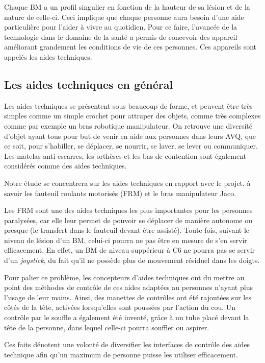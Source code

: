 \documentclass[letterpaper, twoside, 12pt, memoire, creativecommons, hyperref]{thETS}
\begin{document}
Chaque BM a un profil singulier en fonction de la hauteur de sa lésion et de la nature de celle-ci. Ceci implique que chaque personne aura besoin d'une aide particulière pour l'aider à vivre au quotidien. Pour ce faire,  l'avancée de la technologie dans le domaine de la santé a permis de concevoir des appareil améliorant grandement les conditions de vie de ces personnes. Ces appareils sont appelés les aides techniques. 

\subsection{Les aides techniques en général}

Les aides techniques se présentent sous beaucoup de forme, et peuvent être très simples comme un simple crochet pour attraper des objets, comme très complexes comme par exemple un bras robotique manipulateur. On retrouve une diversité d'objet ayant tous pour but de venir en aide aux personnes dans leurs AVQ, que ce soit, pour s'habiller, se déplacer, se nourrir, se laver, se lever ou communiquer. Les matelas anti-escarres, les orthèses et les bas de contention sont également considérés comme des aides techniques.

Notre étude se concentrera sur les aides techniques en rapport avec le projet, à savoir les fauteuil roulants motorisés (FRM) et le bras manipulateur Jaco.

Les FRM sont une des aides techniques les plus importantes pour les personnes paralysées, car elle leur permet de pouvoir se déplacer de manière autonome ou presque (le transfert dans le fauteuil devant être assisté). Toute fois, suivant le niveau de lésion d'un BM, celui-ci pourra ne pas être en mesure de s'en servir efficacement. En effet, un BM de niveau suppérieur à C6 ne pourra pas se servir d'un \textit{joystick}, du fait qu'il ne possède plus de mouvement résiduel dans les doigts. 

Pour palier ce problème, les concepteurs d'aides techniques ont du mettre au point des méthodes de contrôle de ces aides adaptées au personnes n'ayant plus l'usage de leur mains. Ainsi, des manettes de contrôles ont été rajoutées sur les côtés de la tête, activées lorsqu'elles sont poussées par l'action du cou. Un contrôle par le souffle a également été inventé, grâce à un tube placé devant la tête de la personne, dans lequel celle-ci pourra souffler ou aspirer.

Ces faits dénotent une volonté de diversifier les interfaces de contrôle des aides technique afin qu'un maximum de personne puisse les utiliser efficacement.
\end{document}
